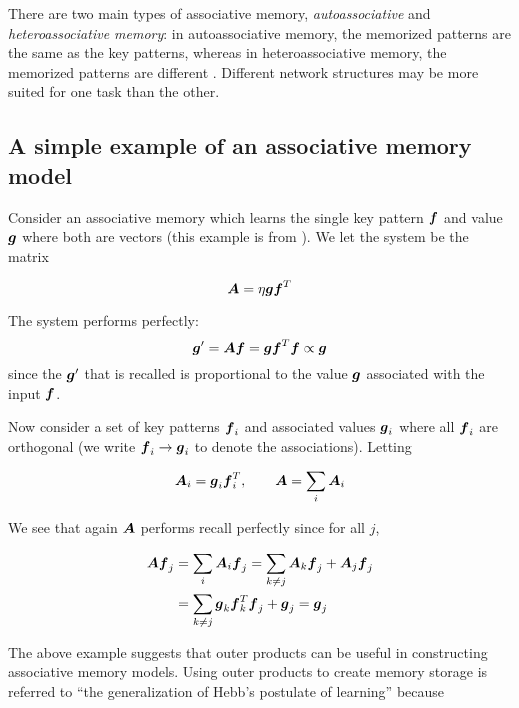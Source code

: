 There are two main types of associative memory, \emph{autoassociative} and \emph{heteroassociative memory}: in autoassociative memory, the memorized patterns are the same as the key patterns, whereas in heteroassociative memory, the memorized patterns are different \cite[p. 38]{Haykin:2009:NNC:1213811}. Different network structures may be more suited for one task than the other.

\subsection{A simple example of an associative memory model}

Consider an associative memory which learns the single key pattern $\boldsymbol{f}$ and value $\boldsymbol{g}$ where both are vectors (this example is from \cite[p. 163-165]{anderson1995introduction}). We let the system be the matrix

\begin{equation*}
\boldsymbol{A} = \eta \boldsymbol{g}\boldsymbol{f}^T
\end{equation*}

The system performs perfectly:
%
\begin{equation*}
\boldsymbol{g}^\prime = \boldsymbol{A}\boldsymbol{f} = \boldsymbol{g}\boldsymbol{f}^T\boldsymbol{f} \propto \boldsymbol{g}
\end{equation*}
%
since the $\boldsymbol{g}^\prime$ that is recalled is proportional to the value $\boldsymbol{g}$ associated with the input $\boldsymbol{f}$.

Now consider a set of key patterns $\boldsymbol{f}_i$ and associated values $\boldsymbol{g}_i$ where all $\boldsymbol{f}_i$ are orthogonal (we write $\boldsymbol{f}_i \rightarrow \boldsymbol{g}_i$ to denote the associations). Letting

\begin{equation*}
\boldsymbol{A}_i = \boldsymbol{g}_i \boldsymbol{f}_i^T, \qquad \boldsymbol{A} = \sum_{i} \boldsymbol{A}_i
\end{equation*}

We see that again $\boldsymbol{A}$ performs recall perfectly since for all $j$,

\begin{align*}
  \boldsymbol{A}\boldsymbol{f}_j & = \sum_{i}\boldsymbol{A}_i \boldsymbol{f}_j = \sum_{k \neq j} \boldsymbol{A}_k \boldsymbol{f}_j + \boldsymbol{A}_j\boldsymbol{f}_j \\
  & = \sum_{k \neq j} \boldsymbol{g}_k \boldsymbol{f}_k^T \boldsymbol{f}_j + \boldsymbol{g}_j = \boldsymbol{g}_j
\end{align*}

The above example suggests that outer products can be useful in constructing associative memory models. Using outer products to create memory storage is referred to ``the generalization of Hebb's postulate of learning'' \cite[p. 698]{Haykin:2009:NNC:1213811} because

